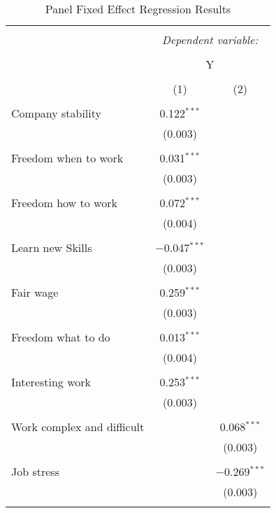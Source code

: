 
\begin{table}[!htbp] \centering 
  \caption{Panel Fixed Effect Regression Results} 
  \label{} 
\begin{tabular}{@{\extracolsep{5pt}}lcc} 
\\[-1.8ex]\hline 
\hline \\[-1.8ex] 
 & \multicolumn{2}{c}{\textit{Dependent variable:}} \\ 
\cline{2-3} 
\\[-1.8ex] & \multicolumn{2}{c}{Y} \\ 
\\[-1.8ex] & (1) & (2)\\ 
\hline \\[-1.8ex] 
 Company stability & 0.122$^{***}$ &  \\ 
  & (0.003) &  \\ 
  & & \\ 
 Freedom when to work & 0.031$^{***}$ &  \\ 
  & (0.003) &  \\ 
  & & \\ 
 Freedom how to work & 0.072$^{***}$ &  \\ 
  & (0.004) &  \\ 
  & & \\ 
 Learn new Skills & $-$0.047$^{***}$ &  \\ 
  & (0.003) &  \\ 
  & & \\ 
 Fair wage & 0.259$^{***}$ &  \\ 
  & (0.003) &  \\ 
  & & \\ 
 Freedom what to do & 0.013$^{***}$ &  \\ 
  & (0.004) &  \\ 
  & & \\ 
 Interesting work & 0.253$^{***}$ &  \\ 
  & (0.003) &  \\ 
  & & \\ 
 Work complex and difficult &  & 0.068$^{***}$ \\ 
  &  & (0.003) \\ 
  & & \\ 
 Job stress &  & $-$0.269$^{***}$ \\ 
  &  & (0.003) \\ 
  & & \\ 

\end{tabular}
\end{table}
